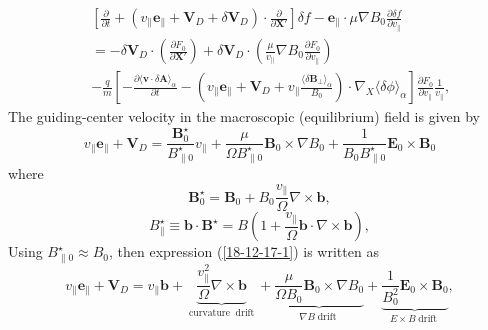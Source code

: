 \documentclass{article}
\newcommand{\tmop}[1]{\ensuremath{\operatorname{#1}}}
\begin{document}
\begin{eqnarray}
  &  & \left[ \frac{\partial}{\partial t} + (v_{\parallel}
  \mathbf{e}_{\parallel} +\mathbf{V}_D + \delta \mathbf{V}_D) \cdot
  \frac{\partial}{\partial \mathbf{X}'} \right] \delta f
  -\mathbf{e}_{\parallel} \cdot \mu \nabla B_0 \frac{\partial \delta
  f}{\partial v_{\parallel}} \nonumber\\
  &  & = - \delta \mathbf{V}_D \cdot \left( \frac{\partial F_0}{\partial
  \mathbf{X}'} \right) + \delta \mathbf{V}_D \cdot \left(
  \frac{\mu}{v_{\parallel}} \nabla B_0 \frac{\partial F_0}{\partial
  v_{\parallel}} \right) \nonumber\\
  &  & - \frac{q}{m} \left[ - \frac{\partial \langle \mathbf{v} \cdot \delta
  \mathbf{A} \rangle_{\alpha}}{\partial t} - \left( v_{\parallel}
  \mathbf{e}_{\parallel} +\mathbf{V}_D + v_{\parallel} \frac{\langle \delta
  \mathbf{B}_{\perp} \rangle_{\alpha}}{B_0} \right) \cdot \nabla_X \langle
  \delta \phi \rangle_{\alpha} \right] \frac{\partial F_0}{\partial
  v_{\parallel}}  \frac{1}{v_{\parallel}},  \label{17-5-13-p2m}
\end{eqnarray}
The guiding-center velocity in the macroscopic (equilibrium) field is given by
\begin{equation}
  \label{18-12-17-1} v_{\parallel} \mathbf{e}_{\parallel} +\mathbf{V}_D =
  \frac{\mathbf{B}^{\star}_0}{B^{\star}_{\parallel 0}} v_{\parallel} +
  \frac{\mu}{\Omega B^{\star}_{\parallel 0}} \mathbf{B}_0 \times \nabla B_0 +
  \frac{1}{B_0 B^{\star}_{\parallel 0}} \mathbf{E}_0 \times \mathbf{B}_0
\end{equation}
where
\begin{equation}
  \mathbf{B}^{\star}_0 =\mathbf{B}_0 + B_0 \frac{v_{\parallel}}{\Omega} \nabla
  \times \mathbf{b},
\end{equation}
\begin{equation}
  \label{5-15-p8} B^{\star}_{\parallel} \equiv \mathbf{b} \cdot
  \mathbf{B}^{\star} = B \left( 1 + \frac{v_{\parallel}}{\Omega} \mathbf{b}
  \cdot \nabla \times \mathbf{b} \right),
\end{equation}
Using $B_{\parallel 0}^{\star} \approx B_0$, then expression
(\ref{18-12-17-1}) is written as
\begin{equation}
  v_{\parallel} \mathbf{e}_{\parallel} +\mathbf{V}_D = v_{\parallel}
  \mathbf{b}+ \underbrace{\frac{v_{\parallel}^2}{\Omega} \nabla \times
  \mathbf{b}}_{\tmop{curvature} \tmop{drift}} + \underbrace{\frac{\mu}{\Omega
  B_0} \mathbf{B}_0 \times \nabla B_0}_{\nabla B \tmop{drift}} +
  \underbrace{\frac{1}{B_0^2} \mathbf{E}_0 \times \mathbf{B}_0}_{E \times B
  \tmop{drift}},
\end{equation}
\end{document}
